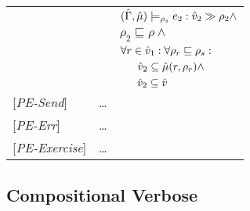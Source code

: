 \begin{tabular} {l l l l}
&&\multicolumn{2}{l}{$ (\hat{\Gamma},\hat{\mu}) \models_{\rho_s} e_2 : \hat{v}_{2} \gg \rho_{2} \wedge $}\\
&&\multicolumn{2}{l}{$\rho_2 \sqsubseteq \rho \wedge$}\\
&&\multicolumn{2}{l}{$\forall r \in \hat{v}_1 : \forall \rho_r \sqsubseteq \rho_s :$}\\
&&&$\hat{v}_2 \subseteq \hat{\mu}(r, \rho_r) \wedge$ \\
&&&$\hat{v}_2 \subseteq \hat{v} $\\
{[\textit{PE-Send}]}& \dots \\
{[\textit{PE-Err}]}& \dots \\
{[\textit{PE-Exercise}]}& \dots \\
\end{tabular}

\subsection{Compositional Verbose}

